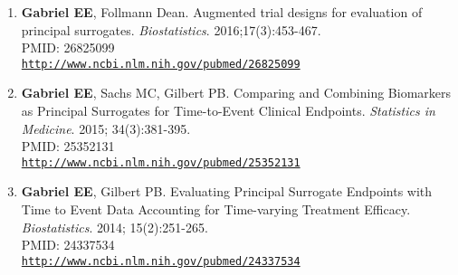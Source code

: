 \documentclass[12pt]{article}
\providecommand \url[1]{\href{#1}{#1}}
\renewcommand*\url[1]{\href{#1}{\texttt{#1}}}
\begin{document}
\begin{enumerate}
\item \textbf{Gabriel  EE}, Follmann Dean. Augmented trial designs for evaluation of principal surrogates. \emph{Biostatistics}. 2016;17(3):453-467.\\
PMID: 26825099\\
\url{http://www.ncbi.nlm.nih.gov/pubmed/26825099}

\item \textbf{Gabriel EE}, Sachs MC, Gilbert PB. Comparing and Combining Biomarkers as Principal Surrogates for Time-to-Event Clinical Endpoints.  \emph{Statistics in Medicine}. 2015; 34(3):381-395.\\
PMID: 25352131\\
\url{http://www.ncbi.nlm.nih.gov/pubmed/25352131}



\item \textbf{Gabriel EE}, Gilbert PB. Evaluating Principal Surrogate Endpoints with Time to Event Data Accounting for Time-varying Treatment Efficacy. \emph{Biostatistics}. 2014;  15(2):251-265.\\
PMID: 24337534 \\
\url{http://www.ncbi.nlm.nih.gov/pubmed/24337534}
\end{enumerate}
\end{document}
